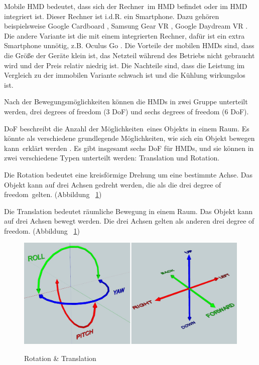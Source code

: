   Mobile HMD bedeutet, dass sich der \glqq Rechner\grqq\ im HMD befindet oder im HMD integriert ist. Dieser Rechner ist i.d.R. ein Smartphone. Dazu gehören beispielsweise Google Cardboard \citep{33}, Samsung Gear VR \citep{34}, Google Daydream VR \citep{35}. Die andere Variante ist die mit einem integrierten Rechner, dafür ist ein extra Smartphone unnötig, z.B. Oculus Go \citep{36}. Die Vorteile der mobilen HMDs sind, dass die Größe der Geräte klein ist, das Netzteil während des Betriebs nicht gebraucht wird und der Preis relativ niedrig ist. Die Nachteile sind, dass die Leistung im Vergleich zu der immobilen Variante schwach ist und die Kühlung wirkungslos ist.
  
  Nach der Bewegungsmöglichkeiten können die HMDs in zwei Gruppe unterteilt werden, drei degrees of freedom (3 DoF) und sechs degrees of freedom (6 DoF).
  
  DoF beschreibt die \glqq Anzahl der Möglichkeiten\grqq\ eines Objekts in einem Raum. Es könnte als \glqq verschiedene grundlegende Möglichkeiten, wie sich ein Objekt bewegen kann\grqq\ erklärt werden \citep{25}. Es gibt insgesamt sechs DoF für HMDs, und sie können in zwei verschiedene Typen unterteilt werden: Translation und Rotation.
  
  Die Rotation bedeutet eine kreisförmige Drehung um eine bestimmte Achse. Das Objekt kann auf drei Achsen gedreht werden, die als die drei \glqq degree of freedom\grqq\ gelten. (Abbildung ~\ref{fig:translationRotation})
  
  Die Translation bedeutet räumliche Bewegung in einem Raum. Das Objekt kann auf drei Achsen bewegt werden. Die drei Achsen gelten als anderen drei \glqq degree of freedom\grqq. (Abbildung ~\ref{fig:translationRotation})

\begin{figure}[ht]
\vspace*{1em}
\centering
\caption{Rotation \& Translation}
\includegraphics[width=\textwidth]{images/translationRotation.png}
\label{fig:translationRotation} 
\end{figure}
  
